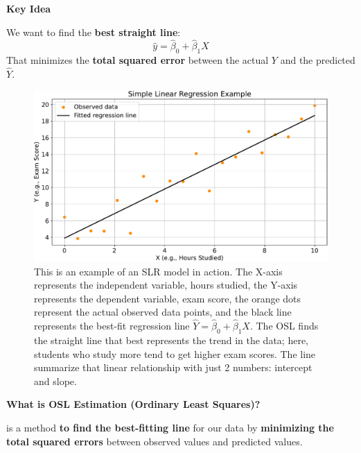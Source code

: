 \highspace
\begin{flushleft}
    \textcolor{Green3}{ \textbf{Key Idea}}
\end{flushleft}
We want to find the \textbf{best straight line}:
\begin{equation*}
    \hat{y} = \hat{\beta}_0 + \hat{\beta}_1 X
\end{equation*}
That minimizes the \textbf{total squared error} between the actual $Y$ and the predicted $\hat{Y}$.

\newpage

\begin{figure}[!htp]
    \centering
    \includegraphics[width=\textwidth]{img/linear-regression/slr.pdf}
    \caption{This is an example of an SLR model in action. The X-axis represents the independent variable, hours studied, the Y-axis represents the dependent variable, exam score, the orange dots represent the actual observed data points, and the black line represents the best-fit regression line $\hat{Y} = \hat{\beta}_{0} + \hat{\beta}_{1} X$. The OSL finds the straight line that best represents the trend in the data; here, students who study more tend to get higher exam scores. The line summarize that linear relationship with just 2 numbers: intercept and slope.}
\end{figure}

\begin{flushleft}
    \textcolor{Green3}{ \textbf{What is OSL Estimation (Ordinary Least Squares)?}}
\end{flushleft}
 is a method \textbf{to find the best-fitting line} for our data by \textbf{minimizing the total squared errors} between observed values and predicted values.

